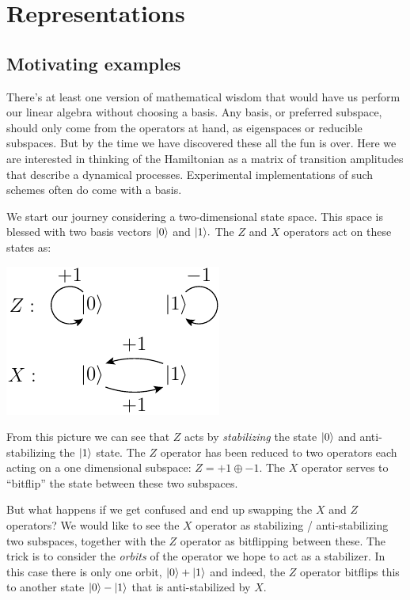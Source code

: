 \documentclass[12pt]{article}
\begin{document}
\section{Representations}

\subsection{Motivating examples}

There's at least one version of mathematical wisdom that would
have us perform our linear algebra without choosing a basis.
Any basis, or preferred subspace, should only come from the
operators at hand, as eigenspaces or reducible subspaces.
But by the time we have discovered these all the fun is over.
Here we are interested in 
thinking of the Hamiltonian as a matrix of transition
amplitudes that describe a dynamical processes. 
Experimental implementations of such schemes
often do come with a basis.

We start our journey considering a two-dimensional state space.
This space is blessed with two basis vectors $|{0}\rangle$ and $|{1}\rangle.$
The $Z$ and $X$ operators act on these states as:
\begin{center}
\includegraphics[]{pic-zx.pdf}
\end{center}
From this picture we can see that $Z$ acts by \emph{stabilizing} the
state $|{0}\rangle$ and anti-stabilizing the $|{1}\rangle$ state.
The $Z$ operator has been reduced 
to two operators each acting on a one dimensional subspace:
$Z = +1 \oplus -1.$
The $X$ operator serves to ``bitflip'' the state between
these two subspaces.

But what happens if we get confused and end up swapping
the $X$ and $Z$ operators? We would like to see the $X$ operator
as stabilizing / anti-stabilizing two subspaces, together with the
$Z$ operator as bitflipping between these.
The trick is to consider the \emph{orbits} of the operator
we hope to act as a stabilizer.
In this case there is only one orbit, $|{0}\rangle+|{1}\rangle$
and indeed, the $Z$ operator bitflips this to another state
$|{0}\rangle-|{1}\rangle$ that is anti-stabilized by $X.$
\end{document}
